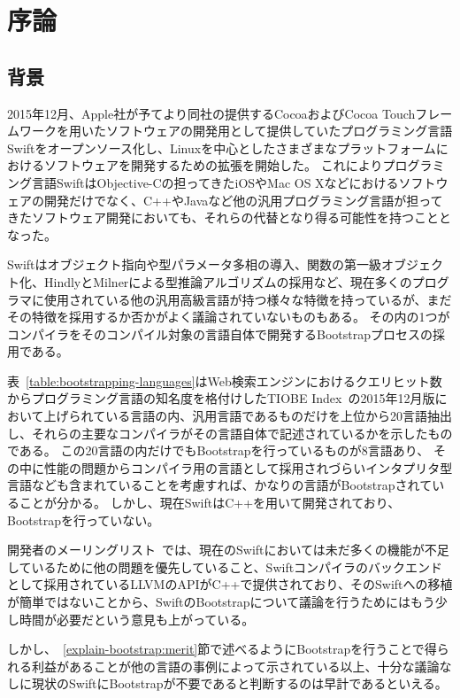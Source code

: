 \chapter{序論}
\label{introduction}

\section{背景}
\label{introduction:background}

2015年12月、Apple社が予てより同社の提供するCocoaおよびCocoa Touchフレームワークを用いたソフトウェアの開発用として提供していたプログラミング言語Swiftをオープンソース化し、Linuxを中心としたさまざまなプラットフォームにおけるソフトウェアを開発するための拡張を開始した。
これによりプログラミング言語SwiftはObjective-Cの担ってきたiOSやMac OS Xなどにおけるソフトウェアの開発だけでなく、C++やJavaなど他の汎用プログラミング言語が担ってきたソフトウェア開発においても、それらの代替となり得る可能性を持つこととなった。

Swiftはオブジェクト指向や型パラメータ多相の導入、関数の第一級オブジェクト化、HindlyとMilnerによる型推論アルゴリズムの採用など、現在多くのプログラマに使用されている他の汎用高級言語が持つ様々な特徴を持っているが、まだその特徴を採用するか否かがよく議論されていないものもある。
その内の1つがコンパイラをそのコンパイル対象の言語自体で開発するBootstrapプロセスの採用である。

表~\ref{table:bootstrapping-languages}はWeb検索エンジンにおけるクエリヒット数からプログラミング言語の知名度を格付けしたTIOBE Index~\cite{tiobe}の2015年12月版において上げられている言語の内、汎用言語であるものだけを上位から20言語抽出し、それらの主要なコンパイラがその言語自体で記述されているかを示したものである。
この20言語の内だけでもBootstrapを行っているものが8言語あり、 その中に性能の問題からコンパイラ用の言語として採用されづらいインタプリタ型言語なども含まれていることを考慮すれば、かなりの言語がBootstrapされていることが分かる。
しかし、現在SwiftはC++を用いて開発されており、Bootstrapを行っていない。

開発者のメーリングリスト~\cite{dev-ml}では、現在のSwiftにおいては未だ多くの機能が不足しているために他の問題を優先していること、Swiftコンパイラのバックエンドとして採用されているLLVMのAPIがC++で提供されており、そのSwiftへの移植が簡単ではないことから、SwiftのBootstrapについて議論を行うためにはもう少し時間が必要だという意見も上がっている。

しかし、~\ref{explain-bootstrap:merit}節で述べるようにBootstrapを行うことで得られる利益があることが他の言語の事例によって示されている以上、十分な議論なしに現状のSwiftにBootstrapが不要であると判断するのは早計であるといえる。

